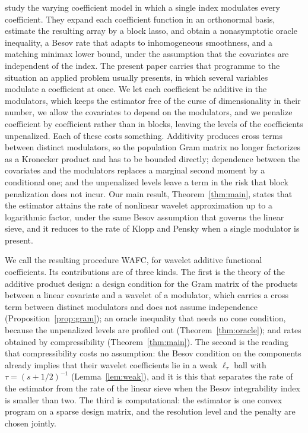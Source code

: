 \documentclass[12pt]{article} %
\theoremstyle{definition}
\begin{document}
\citet{Klopp-Pensky-2015} study the varying coefficient model in which a
single index modulates every coefficient. They expand each coefficient
function in an orthonormal basis, estimate the resulting array by a block
lasso, and obtain a nonasymptotic oracle inequality, a Besov rate that adapts
to inhomogeneous smoothness, and a matching minimax lower bound, under the
assumption that the covariates are independent of the index. The present paper
carries that programme to the situation an applied problem usually presents,
in which several variables modulate a coefficient at once. We let each
coefficient be additive in the modulators, which keeps the estimator free of
the curse of dimensionality in their number, we allow the covariates to depend
on the modulators, and we penalize coefficient by coefficient rather than in
blocks, leaving the levels of the coefficients unpenalized. Each of these
costs something. Additivity produces cross terms between distinct modulators,
so the population Gram matrix no longer factorizes as a Kronecker product and
has to be bounded directly; dependence between the covariates and the
modulators replaces a marginal second moment by a conditional one; and the
unpenalized levels leave a term in the risk that block penalization does not
incur. Our main result, Theorem~\ref{thm:main}, states that the estimator
attains the rate of nonlinear wavelet approximation up to a logarithmic
factor, under the same Besov assumption that governs the linear sieve, and it
reduces to the rate of Klopp and Pensky when a single modulator is present.

We call the resulting procedure WAFC, for wavelet additive functional
coefficients. Its contributions are of three kinds. The first is the theory of
the additive product design: a design condition for the Gram matrix of the
products between a linear covariate and a wavelet of a modulator, which
carries a cross term between distinct modulators and does not assume
independence (Proposition~\ref{prop:gram}); an oracle inequality that needs no
cone condition, because the unpenalized levels are profiled out
(Theorem~\ref{thm:oracle}); and rates obtained by compressibility
(Theorem~\ref{thm:main}). The second is the reading that compressibility costs
no assumption: the Besov condition on the components already implies that
their wavelet coefficients lie in a weak $\ell_\tau$ ball with
$\tau = (s+1/2)^{-1}$ (Lemma~\ref{lem:weak}), and it is this that separates
the rate of the estimator from the rate of the linear sieve when the Besov
integrability index is smaller than two. The third is computational: the
estimator is one convex program on a sparse design matrix, and the resolution
level and the penalty are chosen jointly.
\end{document}
